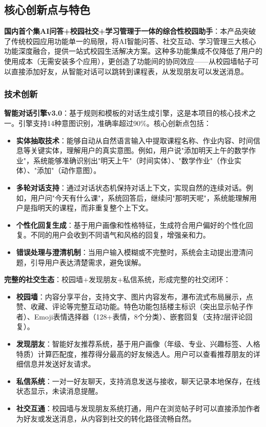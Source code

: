 \documentclass[12pt,a4paper]{article}
\begin{document}
\subsection{核心创新点与特色}

\textbf{国内首个集AI问答+校园社交+学习管理于一体的综合性校园助手}：本产品突破了传统校园应用功能单一的局限，将AI智能问答、社交互动、学习管理三大核心功能深度融合，提供一站式校园生活解决方案。这种多功能集成不仅降低了用户的使用成本（无需安装多个应用），更创造了功能间的协同效应——从校园墙帖子可以直接添加好友，从智能对话可以跳转到课程表，从发现朋友可以发送消息。

\subsubsection{技术创新}

\textbf{智能对话引擎v3.0}：基于规则和模板的对话生成引擎，这是本项目的核心技术之一。引擎支持14种意图识别，准确率超过90\%。核心创新点包括：

\begin{itemize}
    \item \textbf{实体抽取技术}：能够自动从自然语言输入中提取课程名称、作业内容、时间信息等关键实体，理解用户的真实意图。例如，用户说"添加明天上午的数学作业"，系统能够准确识别出"明天上午"（时间实体）、"数学作业"（作业实体）、"添加"（动作意图）。
    \item \textbf{多轮对话支持}：通过对话状态机保持对话上下文，实现自然的连续对话。例如，用户问"今天有什么课"，系统回答后，继续问"那明天呢"，系统能理解用户是指明天的课程，而非重复整个上下文。
    \item \textbf{个性化回复生成}：基于用户画像和性格特征，生成符合用户偏好的个性化回复。不同的用户会收到不同语气和风格的回复，增强亲和力。
    \item \textbf{错误处理与澄清机制}：当用户输入模糊或不完整时，系统会主动提出澄清问题，引导用户表达清楚需求，避免误解。
\end{itemize}

\textbf{完整的社交生态}：校园墙+发现朋友+私信系统，形成完整的社交闭环：

\begin{itemize}
    \item \textbf{校园墙}：内容分享平台，支持文字、图片内容发布，瀑布流式布局展示，点赞、收藏、评论等完整互动功能。特色功能包括楼主标识（突出显示帖子作者）、Emoji表情选择器（128+表情，8个分类）、嵌套回复（支持2层评论回复）。
    \item \textbf{发现朋友}：智能好友推荐系统，基于用户画像（年级、专业、兴趣标签、人格特质）计算匹配度，推荐得分最高的好友候选人。用户可以查看推荐朋友的详细信息并发送好友请求。
    \item \textbf{私信系统}：一对一好友聊天，支持消息发送与接收，聊天记录本地保存，在线状态显示，未读消息提醒。
    \item \textbf{社交互通}：校园墙与发现朋友系统打通，用户在浏览帖子时可以直接添加作者为好友或发送消息，从内容到社交的转化路径流畅自然。
\end{itemize}
\end{document}
